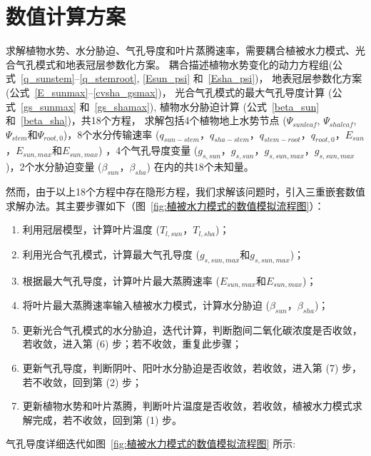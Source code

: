 \section{数值计算方案}\label{数值计算方案}
求解植物水势、水分胁迫、气孔导度和叶片蒸腾速率，需要耦合植被水力模式、光合气孔模式和地表冠层参数化方案。
耦合描述植物水势变化的动力方程组(公式~\eqref{q_sunstem}--\eqref{q_stemroot}, \eqref{Esun_psi} 和~\eqref{Esha_psi})，
地表冠层参数化方案 (公式~\eqref{E_sunmax}--\eqref{cvsha_gsmax})，
光合气孔模式的最大气孔导度计算 (公式~\eqref{gs_sunmax} 和~\eqref{gs_shamax}), 植物水分胁迫计算 (公式~\eqref{beta_sun} 和~\eqref{beta_sha})，共18个方程，
求解包括4个植物地上水势节点 ($\Psi_{sunleaf}$, $\Psi_{shaleaf}$, $\Psi_{stem}$和$\Psi_{root,0}$)，8个水分传输速率 
($q_{sun-stem}$，$q_{sha-stem}$，$q_{stem-root}$，$q_{root,0}$，$E_{sun}$，$E_{sun,max}$和$E_{sun,max}$) ，4个气孔导度变量
 ($g_{s,sun}$，$g_{s,sun}$，$g_{s,sun,max}$，$g_{s,sun,max}$)，2个水分胁迫变量 ($\beta_{sun}$，$\beta_{sha}$) 在内的共18个未知量。

然而，由于以上18个方程中存在隐形方程，我们求解该问题时，引入三重嵌套数值求解办法。其主要步骤如下（图~\ref{fig:植被水力模式的数值模拟流程图}）：
\begin{enumerate}
    \item 利用冠层模型，计算叶片温度 ($T_{l,sun}$，$T_{l,sha}$)；
    \item 利用光合气孔模式，计算最大气孔导度 ($g_{s,sun,max}$和$g_{s,sun,max}$)；
    \item 根据最大气孔导度，计算叶片最大蒸腾速率 ($E_{sun,max}$和$E_{sun,max}$)；
    \item 将叶片最大蒸腾速率输入植被水力模式，计算水分胁迫 ($\beta_{sun}$，$\beta_{sha}$)；
    \item 更新光合气孔模式的水分胁迫，迭代计算，判断胞间二氧化碳浓度是否收敛，若收敛，进入第 (6) 步；若不收敛，重复此步骤；
    \item 更新气孔导度，判断阴叶、阳叶水分胁迫是否收敛，若收敛，进入第 (7) 步，若不收敛，回到第 (2) 步；
    \item 更新植物水势和叶片蒸腾，判断叶片温度是否收敛，若收敛，植被水力模式求解完成，若不收敛，回到第 (1) 步。
\end{enumerate}

气孔导度详细迭代如图~\ref{fig:植被水力模式的数值模拟流程图} 所示:

